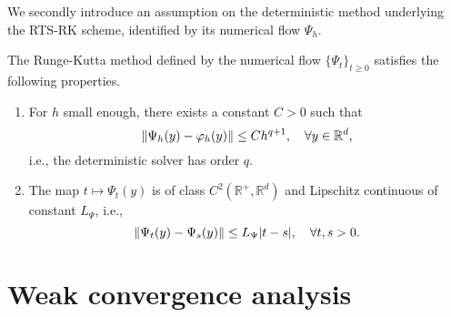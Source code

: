 \documentclass{siamart1116}
\numberwithin{theorem}{section}
\DeclarePairedDelimiter{\abs}{\lvert}{\rvert}
\DeclarePairedDelimiter{\norm}{\|}{\|}
\renewcommand{\phi}{\varphi}
\newcommand{\R}{\mathbb{R}}
\begin{document}
We secondly introduce an assumption on the deterministic  method underlying the RTS-RK scheme, identified by its numerical flow $\Psi_h$. 
\begin{assumption}\label{as:PsiStrong} The Runge-Kutta method defined by the numerical flow $\{\Psi_t\}_{t\geq 0}$ satisfies the following properties.
	\begin{enumerate}
		\item\label{as:PsiStrong_Order} For $h$ small enough, there exists a constant $C > 0$ such that
		\begin{equation}
		\norm{\Psi_h(y) - \phi_h(y)} \leq Ch^{q+1}, \quad \forall y \in \R^d,
		\end{equation}
		i.e., the deterministic solver has order $q$.
		\item\label{as:PsiStrong_Time} The map $t \mapsto \Psi_t(y)$ is of class $C^2(\R^+, \R^d)$ and Lipschitz continuous of constant $L_\Psi$, i.e.,
		\begin{equation}\label{eq:LipschitzPsiT}
		\norm{\Psi_t(y) - \Psi_s(y)} \leq L_\Psi \abs{t - s}, \quad \forall t, s > 0.
		\end{equation}
	\end{enumerate}
\end{assumption}


\section{Weak convergence analysis}\label{sec:WeakOrder}
\end{document}
